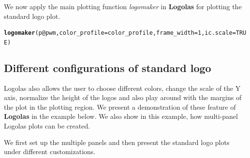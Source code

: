 \documentclass[12pt]{article}\usepackage[]{graphicx}\usepackage[usenames,dvipsnames]{color}
\makeatletter
\newcommand{\hlnum}[1]{\textcolor[rgb]{0.686,0.059,0.569}{#1}}%
\newcommand{\hlopt}[1]{\textcolor[rgb]{0,0,0}{#1}}%
\newcommand{\hlstd}[1]{\textcolor[rgb]{0.345,0.345,0.345}{#1}}%
\newcommand{\hlkwc}[1]{\textcolor[rgb]{0.333,0.667,0.333}{#1}}%
\newcommand{\hlkwd}[1]{\textcolor[rgb]{0.737,0.353,0.396}{\textbf{#1}}}%
\newenvironment{kframe}{%
 \def\at@end@of@kframe{}%
 \ifinner\ifhmode%
  \def\at@end@of@kframe{\end{minipage}}%
  \begin{minipage}{\columnwidth}%
 \fi\fi%
 \def\FrameCommand##1{\hskip\@totalleftmargin \hskip-\fboxsep
 \colorbox{shadecolor}{##1}\hskip-\fboxsep
     \hskip-\linewidth \hskip-\@totalleftmargin \hskip\columnwidth}%
 \MakeFramed {\advance\hsize-\width
   \@totalleftmargin\z@ \linewidth\hsize
   \@setminipage}}%
 {\par\unskip\endMakeFramed%
 \at@end@of@kframe}
\newenvironment{knitrout}{}{} %
\makeatother
\begin{document}
We now apply the main plotting function \textit{logomaker} in \textbf{Logolas} for plotting the standard logo plot.

\begin{knitrout}
\color{fgcolor}\begin{kframe}
\begin{alltt}
\hlkwd{logomaker}\hlstd{(p}\hlopt{@}\hlkwc{pwm}\hlstd{,}\hlkwc{color_profile} \hlstd{= color_profile,} \hlkwc{frame_width} \hlstd{=} \hlnum{1}\hlstd{,}\hlkwc{ic.scale} \hlstd{=} \hlnum{TRUE}\hlstd{)}
\end{alltt}
\end{kframe}
\end{knitrout}

\subsection{Different configurations of standard logo}

Logolas also allows the user to choose different colors, change the scale of the Y axis, normalize the height of the logos and also play around with the margins of the plot in the plotting region. We present a demonstration of these feature of \textbf{Logolas} in the example below. We also show in this example, how multi-panel Logolas plots can be created.

We first set up the multiple panels and then present the standard logo plots under different customizations.
\end{document}
